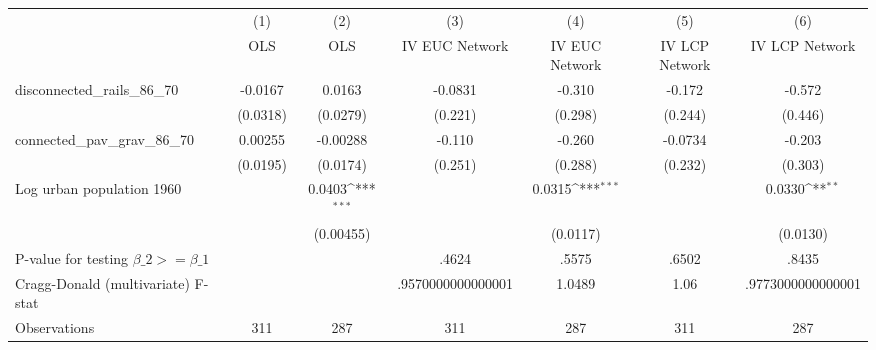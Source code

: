 {
\def\sym#1{\ifmmode^{#1}\else\(^{#1}\)\fi}
\begin{tabular}{l*{6}{c}}
\hline\hline
                &\multicolumn{1}{c}{(1)}&\multicolumn{1}{c}{(2)}&\multicolumn{1}{c}{(3)}&\multicolumn{1}{c}{(4)}&\multicolumn{1}{c}{(5)}&\multicolumn{1}{c}{(6)}\\
                &\multicolumn{1}{c}{OLS}&\multicolumn{1}{c}{OLS}&\multicolumn{1}{c}{IV EUC Network}&\multicolumn{1}{c}{IV EUC Network}&\multicolumn{1}{c}{IV LCP Network}&\multicolumn{1}{c}{IV LCP Network}\\
\hline
disconnected\_rails\_86\_70&  -0.0167         &   0.0163         &  -0.0831         &   -0.310         &   -0.172         &   -0.572         \\
                & (0.0318)         & (0.0279)         &  (0.221)         &  (0.298)         &  (0.244)         &  (0.446)         \\
[1em]
connected\_pav\_grav\_86\_70&  0.00255         & -0.00288         &   -0.110         &   -0.260         &  -0.0734         &   -0.203         \\
                & (0.0195)         & (0.0174)         &  (0.251)         &  (0.288)         &  (0.232)         &  (0.303)         \\
[1em]
Log urban population 1960&                  &   0.0403\sym{***}&                  &   0.0315\sym{***}&                  &   0.0330\sym{**} \\
                &                  &(0.00455)         &                  & (0.0117)         &                  & (0.0130)         \\
\hline
P-value for testing $\beta\_{2} >= \beta\_{1}$&                  &                  &    .4624         &    .5575         &    .6502         &    .8435         \\
Cragg-Donald (multivariate) F-stat&                  &                  &.9570000000000001         &   1.0489         &     1.06         &.9773000000000001         \\
Observations    &      311         &      287         &      311         &      287         &      311         &      287         \\
\hline\hline
\end{tabular}
}
